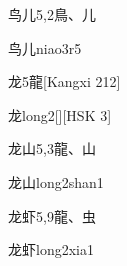 \begin{entry}{鸟儿}{5,2}{⿃、⼉}
  \begin{phonetics}{鸟儿}{niao3r5}
  \end{phonetics}
\end{entry}

\begin{entry}{龙}{5}{⿓}[Kangxi 212]
  \begin{phonetics}{龙}{long2}[][HSK 3]
  \end{phonetics}
\end{entry}

\begin{entry}{龙山}{5,3}{⿓、⼭}
  \begin{phonetics}{龙山}{long2shan1}
  \end{phonetics}
\end{entry}

\begin{entry}{龙虾}{5,9}{⿓、⾍}
  \begin{phonetics}{龙虾}{long2xia1}
  \end{phonetics}
\end{entry}


